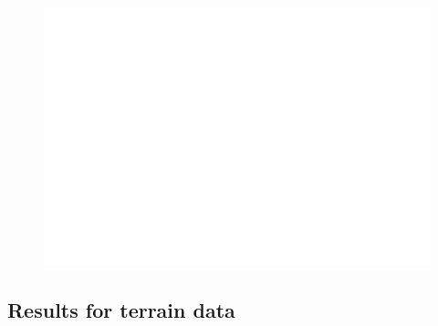 \begin{figure}[h!]
	\centering
	\includegraphics[width=\textwidth]{Images/Bootstrap_crossval_crossvalsklearn.png}
	\caption{}
	\label{Cross validation comparison with bootstap}
\end{figure}

\subsection{Results for terrain data}
